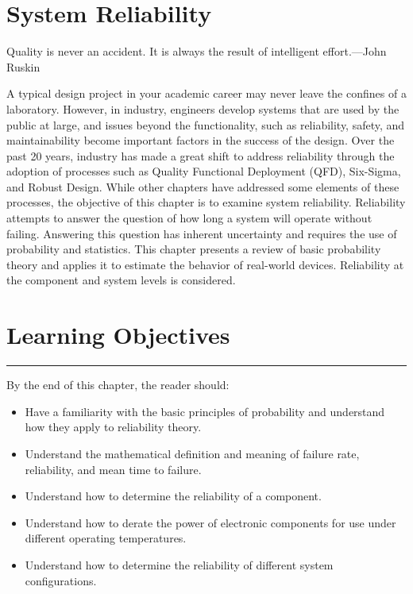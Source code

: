 \section{System Reliability}
\graphicspath{ {./chapter08/Fig} }

\begin{itquote}
Quality is never an accident. It is always the result of intelligent
effort.---John Ruskin
\end{itquote}


A typical design project in your academic career may never leave the
confines of a laboratory. However, in industry, engineers develop
systems that are used by the public at large, and issues beyond the
functionality, such as reliability, safety, and maintainability become
important factors in the success of the design. Over the past 20 years,
industry has made a great shift to address reliability through the
adoption of processes such as Quality Functional Deployment (QFD),
Six-Sigma, and Robust Design. While other chapters have addressed some
elements of these processes, the objective of this chapter is to examine
system reliability. Reliability attempts to answer the question of how
long a system will operate without failing. Answering this question has
inherent uncertainty and requires the use of probability and statistics.
This chapter presents a review of basic probability theory and applies
it to estimate the behavior of real-world devices. Reliability at the
component and system levels is considered.

\section*{Learning Objectives}
\noindent\rule{\linewidth}{1pt}
By the end of this chapter, the reader should:


\begin{itemize}
\item
  Have a familiarity with the basic principles of probability and
  understand how they apply to reliability theory.
\item
  Understand the mathematical definition and meaning of failure rate,
  reliability, and mean time to failure.
\item
  Understand how to determine the reliability of a component.
\item
  Understand how to derate the power of electronic components for use
  under different operating temperatures.
\item
  Understand how to determine the reliability of different system
  configurations.
\end{itemize}

